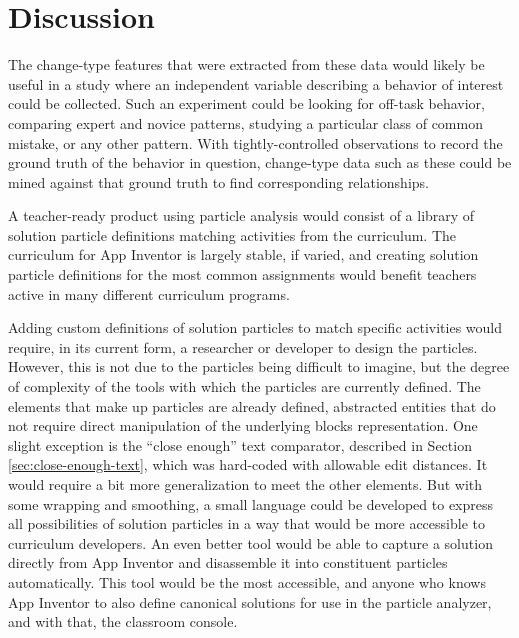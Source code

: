 \chapter{Discussion}
	
The change-type features that were extracted from these data would likely be useful in a study where an independent variable describing a behavior of interest could be collected. Such an experiment could be looking for off-task behavior, comparing expert and novice patterns, studying a particular class of common mistake, or any other pattern. With tightly-controlled observations to record the ground truth of the behavior in question, change-type data such as these could be mined against that ground truth to find corresponding relationships. 

A teacher-ready product using particle analysis would consist of a library of solution particle definitions matching activities from the curriculum. The curriculum for App Inventor is largely stable, if varied, and creating solution particle definitions for the most common assignments would benefit teachers active in many different curriculum programs. 

Adding custom definitions of solution particles to match specific activities would require, in its current form, a researcher or developer to design the particles. However, this is not due to the particles being difficult to imagine, but the degree of complexity of the tools with which the particles are currently defined. The elements that make up particles are already defined, abstracted entities that do not require direct manipulation of the underlying blocks representation. One slight exception is the ``close enough'' text comparator, described in Section \ref{sec:close-enough-text}, which was hard-coded with allowable edit distances. It would require a bit more generalization to meet the other elements. But with some wrapping and smoothing, a small language could be developed to express all possibilities of solution particles in a way that would be more accessible to curriculum developers. An even better tool would be able to capture a solution directly from App Inventor and disassemble it into constituent particles automatically. This tool would be the most accessible, and anyone who knows App Inventor to also define canonical solutions for use in the particle analyzer, and with that, the classroom console. 


